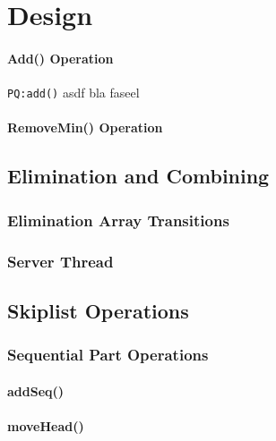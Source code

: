 
\section{Design}



\paragraph{Add() Operation}

\texttt{PQ:add()} asdf bla faseel

\paragraph{RemoveMin() Operation}

\subsection{Elimination and Combining}

\subsubsection{Elimination Array Transitions}

\subsubsection{Server Thread}

\subsection{Skiplist Operations}

\subsubsection{Sequential Part Operations}

\paragraph{addSeq()}

\paragraph{moveHead()}

